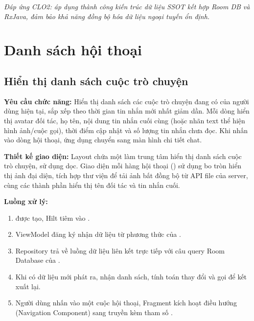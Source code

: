 \textit{Đáp ứng CLO2: áp dụng thành công kiến trúc dữ liệu SSOT kết hợp Room DB và RxJava, đảm bảo khả năng đồng bộ hóa dữ liệu ngoại tuyến ổn định.}


\section{Danh sách hội thoại}

\subsection{Hiển thị danh sách cuộc trò chuyện}
\textbf{Yêu cầu chức năng:} Hiển thị danh sách các cuộc trò chuyện đang có của người dùng hiện tại, sắp xếp theo thời gian tin nhắn mới nhất giảm dần. Mỗi dòng hiển thị avatar đối tác, họ tên, nội dung tin nhắn cuối cùng (hoặc nhãn text thể hiện hình ảnh/cuộc gọi), thời điểm cập nhật và số lượng tin nhắn chưa đọc. Khi nhấn vào dòng hội thoại, ứng dụng chuyển sang màn hình chi tiết chat.

\textbf{Thiết kế giao diện:} Layout  chứa một  làm trung tâm hiển thị danh sách cuộc trò chuyện, sử dụng  dọc. Giao diện mỗi hàng hội thoại () sử dụng  bo tròn hiển thị ảnh đại diện, tích hợp thư viện  để tải ảnh bất đồng bộ từ API file của server, cùng các thành phần  hiển thị tên đối tác và tin nhắn cuối.

\textbf{Luồng xử lý:}
\begin{enumerate}
    \item {} được tạo, Hilt tiêm vào .
    \item ViewModel đăng ký nhận dữ liệu từ phương thức  của .
    \item Repository trả về luồng dữ liệu  liên kết trực tiếp với câu query Room Database của .
    \item Khi có dữ liệu mới phát ra,  nhận danh sách, tính toán thay đổi và gọi  để kết xuất lại.
    \item Người dùng nhấn vào một cuộc hội thoại, Fragment kích hoạt điều hướng (Navigation Component) sang  truyền kèm tham số .
\end{enumerate}

